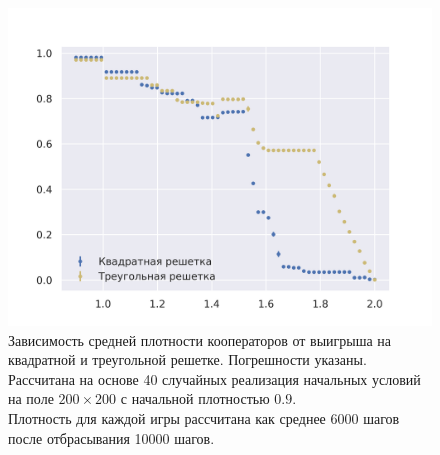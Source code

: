 \documentclass[12pt]{article}
\begin{document}
        \begin{figure}[!h]
            \centering
            \captionsetup{justification=centering}
            \includegraphics[scale=0.8]{TriangularMeanFieldGame/density_square_triangular.png}
            \caption{Зависимость средней плотности кооператоров от выигрыша на квадратной и треугольной решетке. Погрешности указаны.\\
            Рассчитана на основе 40 случайных реализация начальных условий на поле $200\times200$ с начальной плотностью $0.9$.\\
            Плотность для каждой игры рассчитана как среднее 6000 шагов после отбрасывания 10000 шагов. 
            }
            \label{fig:payoffvsdensitytrsq}
        \end{figure}
        
\end{document}
